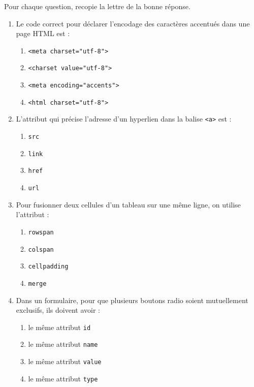 \documentclass[11pt]{article}
\begin{document}
\begin{exercice}
Pour chaque question, recopie la lettre de la bonne réponse.
\begin{enumerate}
\item Le code correct pour déclarer l'encodage des caractères accentués dans une page HTML est :
\begin{enumerate}
\item \texttt{<meta charset="utf-8">}
\item \texttt{<charset value="utf-8">}
\item \texttt{<meta encoding="accents">}
\item \texttt{<html charset="utf-8">}
\end{enumerate}
\item L'attribut qui précise l'adresse d'un hyperlien dans la balise \texttt{<a>} est :
\begin{enumerate}
\item \texttt{src}
\item \texttt{link}
\item \texttt{href}
\item \texttt{url}
\end{enumerate}
\item Pour fusionner deux cellules d'un tableau sur une même ligne, on utilise l'attribut :
\begin{enumerate}
\item \texttt{rowspan}
\item \texttt{colspan}
\item \texttt{cellpadding}
\item \texttt{merge}
\end{enumerate}
\item Dans un formulaire, pour que plusieurs boutons radio soient mutuellement exclusifs, ils doivent avoir :
\begin{enumerate}
\item le même attribut \texttt{id}
\item le même attribut \texttt{name}
\item le même attribut \texttt{value}
\item le même attribut \texttt{type}
\end{enumerate}
\end{enumerate}
\end{exercice}
\end{document}
